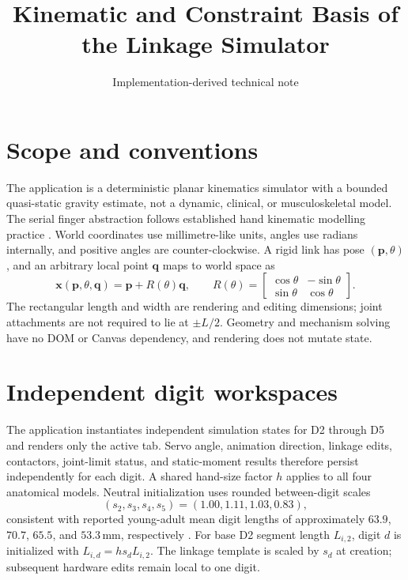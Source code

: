 \documentclass[11pt]{article}
\title{Kinematic and Constraint Basis of the Linkage Simulator}
\author{Implementation-derived technical note}
\date{}
\begin{document}
\maketitle

\section{Scope and conventions}

The application is a deterministic planar kinematics simulator with a bounded
quasi-static gravity estimate, not a dynamic, clinical, or musculoskeletal
model. The serial finger abstraction follows established hand kinematic
modelling practice \cite{an1979normative,buchholz1992anthropometric}. World
coordinates use millimetre-like units, angles use radians internally, and
positive angles are counter-clockwise. A rigid link has pose
$(\mathbf{p},\theta)$, and an arbitrary local point $\mathbf{q}$ maps to world
space as
\begin{equation}
  \mathbf{x}(\mathbf{p},\theta,\mathbf{q})
  =\mathbf{p}+R(\theta)\mathbf{q}, \qquad
  R(\theta)=
  \begin{bmatrix}
    \cos\theta&-\sin\theta\\
    \sin\theta& \cos\theta
  \end{bmatrix}.
\end{equation}
The rectangular length and width are rendering and editing dimensions; joint
attachments are not required to lie at $\pm L/2$. Geometry and mechanism
solving have no DOM or Canvas dependency, and rendering does not mutate state.

\section{Independent digit workspaces}

The application instantiates independent simulation states for D2 through D5
and renders only the active tab. Servo angle, animation direction, linkage
edits, contactors, joint-limit status, and static-moment results therefore
persist independently for each digit. A shared hand-size factor $h$ applies to
all four anatomical models. Neutral initialization uses rounded between-digit
scales
\begin{equation}
  (s_2,s_3,s_4,s_5)=(1.00,1.11,1.03,0.83),
\end{equation}
consistent with reported young-adult mean digit lengths of approximately
$63.9$, $70.7$, $65.5$, and $53.3\,\mathrm{mm}$, respectively
\cite{chatzioglou2024biometric}. For base D2 segment length $L_{i,2}$, digit
$d$ is initialized with $L_{i,d}=h s_d L_{i,2}$. The linkage template is scaled
by $s_d$ at creation; subsequent hardware edits remain local to one digit.
\end{document}
